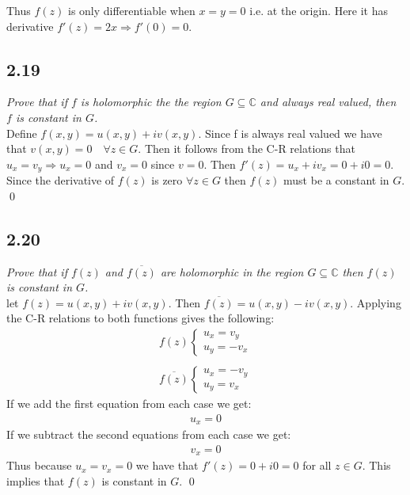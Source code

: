 \documentclass[a4paper, 11pt]{article}
\begin{document}
	\noindent Thus $f(z)$ is only differentiable when $x=y=0$ i.e. at the origin. Here it has derivative $f'(z) = 2x \Rightarrow f'(0)=0$. \\
	
\subsection*{2.19}
	\textit{Prove that if $f$ is holomorphic the the region $G\subseteq \mathbb{C}$ and always real valued, then $f$ is constant in $G$. } \\ 
	
	\noindent Define $f(x,y) = u(x,y)+iv(x,y)$. Since f is always real valued we have that $v(x,y)=0 \quad \forall z \in G$. Then it follows from the C-R relations that $u_x = v_y \Rightarrow u_x=0$ and $v_x = 0$ since $v=0$. Then $f'(z) = u_x + iv_x = 0 + i0 = 0$. Since the derivative of $f(z)$ is zero $\forall z \in G$ then $f(z)$ must be a constant in $G$. \qed 
	
\subsection*{2.20} 
	\textit{Prove that if $f(z)$ and $\overline{f(z)}$ are holomorphic in the region $G\subseteq\mathbb{C}$ then $f(z)$ is constant in $G$.} \\ 
	
	\noindent let $f(z)=u(x,y)+iv(x,y)$. Then $\overline{f(z)} = u(x,y)-iv(x,y)$. Applying the C-R relations to both functions gives the following:
		\begin{align*}
			f(z)\begin{cases}
				u_x = v_y \\ 
				u_y = -v_x 
			\end{cases} \\ 
			\quad \\
			\overline{f(z)}\begin{cases}
				u_x = -v_y \\ 
				u_y = v_x 
			\end{cases}
		\end{align*}
	\noindent If we add the first equation from each case we get: 
		\begin{align*}
			u_x = 0 
		\end{align*}
	\noindent If we subtract the second equations from each case we get: 
		\begin{align*}
			v_x = 0 
		\end{align*}
	\noindent Thus because $u_x=v_x=0$ we have that $f'(z) = 0 + i0 = 0$ for all $z\in G$. This implies that $f(z)$ is constant in $G$. \qed
\end{document}
